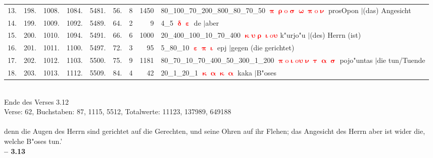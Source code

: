 \documentclass[a4paper,10pt,landscape]{article}
\begin{document}
\begin{tabular}{rrrrrrrrp{120mm}}
13.&198.&1008.&1084.&5481.&56.&8&1450&80\_100\_70\_200\_800\_80\_70\_50 \textcolor{red}{$\boldsymbol{\uppi\uprho\mathrm{o}\upsigma\upomega\uppi\mathrm{o}\upnu}$} prosOpon $|$(das) Angesicht\\
14.&199.&1009.&1092.&5489.&64.&2&9&4\_5 \textcolor{red}{$\boldsymbol{\updelta\upepsilon}$} de $|$aber\\
15.&200.&1010.&1094.&5491.&66.&6&1000&20\_400\_100\_10\_70\_400 \textcolor{red}{$\boldsymbol{\upkappa\upsilon\uprho\upiota\mathrm{o}\upsilon}$} k"urjo"u $|$(des) Herrn (ist)\\
16.&201.&1011.&1100.&5497.&72.&3&95&5\_80\_10 \textcolor{red}{$\boldsymbol{\upepsilon\uppi\upiota}$} epj $|$gegen (die gerichtet)\\
17.&202.&1012.&1103.&5500.&75.&9&1181&80\_70\_10\_70\_400\_50\_300\_1\_200 \textcolor{red}{$\boldsymbol{\uppi\mathrm{o}\upiota\mathrm{o}\upsilon\upnu\uptau\upalpha\upsigma}$} pojo"untas $|$die tun/Tuende\\
18.&203.&1013.&1112.&5509.&84.&4&42&20\_1\_20\_1 \textcolor{red}{$\boldsymbol{\upkappa\upalpha\upkappa\upalpha}$} kaka $|$B"oses\\
\end{tabular}\medskip \\
Ende des Verses 3.12\\
Verse: 62, Buchstaben: 87, 1115, 5512, Totalwerte: 11123, 137989, 649188\\
\\
denn die Augen des Herrn sind gerichtet auf die Gerechten, und seine Ohren auf ihr Flehen; das Angesicht des Herrn aber ist wider die, welche B"oses tun.'\\
\newpage 
{\bf -- 3.13}\\
\medskip \\
\end{document}
